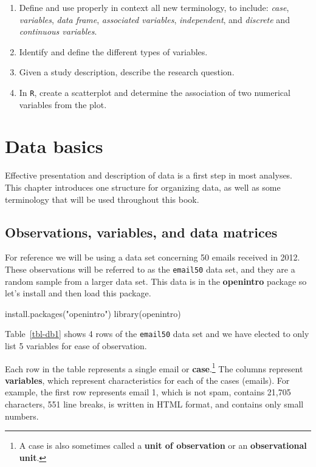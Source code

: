 \documentclass[
  letterpaper,
  DIV=11,
  numbers=noendperiod]{scrreprt}
\newenvironment{Shaded}{\begin{snugshade}}{\end{snugshade}}
\newcommand{\FunctionTok}[1]{\textcolor[rgb]{0.28,0.35,0.67}{#1}}
\newcommand{\NormalTok}[1]{\textcolor[rgb]{0.00,0.23,0.31}{#1}}
\newcommand{\StringTok}[1]{\textcolor[rgb]{0.13,0.47,0.30}{#1}}
\begin{document}
\begin{enumerate}
\def\labelenumi{\arabic{enumi})}
\item
  Define and use properly in context all new terminology, to include:
  \emph{case}, \emph{variables}, \emph{data frame}, \emph{associated
  variables}, \emph{independent}, and \emph{discrete} and
  \emph{continuous variables}.
\item
  Identify and define the different types of variables.
\item
  Given a study description, describe the research question.
\item
  In \texttt{R}, create a scatterplot and determine the association of
  two numerical variables from the plot.
\end{enumerate}

\section{Data basics}\label{data-basics-1}

Effective presentation and description of data is a first step in most
analyses. This chapter introduces one structure for organizing data, as
well as some terminology that will be used throughout this book.

\subsection{Observations, variables, and data
matrices}\label{observations-variables-and-data-matrices}

For reference we will be using a data set concerning 50 emails received
in 2012. These observations will be referred to as the \texttt{email50}
data set, and they are a random sample from a larger data set. This data
is in the \textbf{openintro} package so let's install and then load this
package.

\begin{Shaded}
\begin{Highlighting}[]
\FunctionTok{install.packages}\NormalTok{(}\StringTok{"openintro"}\NormalTok{)}
\FunctionTok{library}\NormalTok{(openintro)}
\end{Highlighting}
\end{Shaded}

Table~\ref{tbl-db1} shows 4 rows of the \texttt{email50} data set and we
have elected to only list 5 variables for ease of observation.

Each row in the table represents a single email or
\textbf{case}.\footnote{A case is also sometimes called a \textbf{unit
  of observation} or an \textbf{observational unit}.} The columns
represent \textbf{variables}, which represent characteristics for each
of the cases (emails). For example, the first row represents email 1,
which is not spam, contains 21,705 characters, 551 line breaks, is
written in HTML format, and contains only small numbers.
\end{document}
